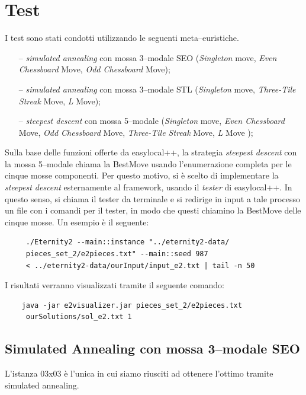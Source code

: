 
\section{Test} %
\label{sec:test}
    
    I test sono stati condotti utilizzando le seguenti meta--euristiche.
    \begin{itemize}
        \item[--] \emph{simulated annealing} con mossa 3--modale SEO (\emph{Singleton} move, \emph{Even Chessboard} Move, \emph{Odd Chessboard} Move);
        \item[--] \emph{simulated annealing} con mossa 3--modale STL (\emph{Singleton} move, \emph{Three-Tile Streak} Move, \emph{L} Move);
        \item[--] \emph{steepest descent} con mossa 5--modale (\emph{Singleton} move, \emph{Even Chessboard} Move, \emph{Odd Chessboard} Move, \emph{Three-Tile Streak} Move, \emph{L} Move );
    \end{itemize}

    Sulla base delle funzioni offerte da easylocal++, la strategia \emph{steepest descent} con la mossa 5--modale chiama la BestMove usando l'enumerazione completa per le cinque mosse componenti. Per questo motivo, si è scelto di implementare la \emph{steepest descent} esternamente al framework, usando il \emph{tester} di easylocal++. In questo senso, si chiama il tester da terminale e si redirige in input a tale processo un file con i comandi per il tester, in modo che questi chiamino la BestMove delle cinque mosse. Un esempio è il seguente:

    \begin{lstlisting}
	 ./Eternity2 --main::instance "../eternity2-data/
	 pieces_set_2/e2pieces.txt" --main::seed 987 
	 < ../eternity2-data/ourInput/input_e2.txt | tail -n 50
	\end{lstlisting}

	I risultati verranno visualizzati tramite il seguente comando:

	\begin{lstlisting}
	java -jar e2visualizer.jar pieces_set_2/e2pieces.txt
	 ourSolutions/sol_e2.txt 1
	\end{lstlisting}
	




	\subsection{Simulated Annealing con mossa 3--modale SEO}
	L'istanza 03x03 è l'unica in cui siamo riusciti ad ottenere l'ottimo tramite simulated annealing.

